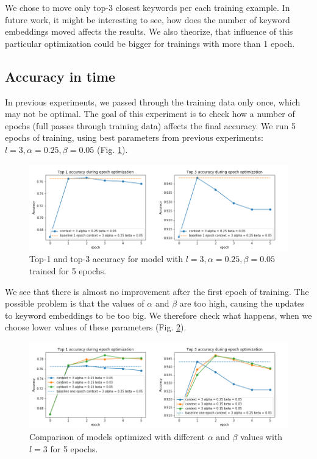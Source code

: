 \documentclass{llncs}
\begin{document}
We chose to move only top-3 closest keywords per each training example. In future work, it might be interesting to see, how does the number of keyword embeddings moved affects the results. We also theorize, that influence of this particular optimization could be bigger for trainings with more than 1 epoch.

\subsection{Accuracy in time}
In previous experiments, we passed through the training data only once, which may not be optimal.
The goal of this experiment is to check how a number of epochs (full passes through training data) affects the final accuracy.
We run 5 epochs of training, using best parameters from previous experiments: \(l=3, \alpha=0.25, \beta=0.05\) (Fig. \ref{fig:exp4_1_epochs_fixed}).

\begin{figure}[H]
    \centering
    \caption{Top-1 and top-3 accuracy for model with \(l=3, \alpha=0.25, \beta=0.05\) trained for 5 epochs.}
    \label{fig:exp4_1_epochs_fixed}
    \includegraphics[scale=0.6]{res/exp4_epoch_top_acc.png}
\end{figure}

We see that there is almost no improvement after the first epoch of training.
The possible problem is that the values of \(\alpha\) and \(\beta\) are too high, causing the updates to keyword embeddings to be too big.
We therefore check what happens, when we choose lower values of these parameters (Fig. \ref{fig:exp4_2_epochs_comparison}).

\begin{figure}[H]
    \centering
    \caption{Comparison of models optimized with different \(\alpha\) and \(\beta\) values with \(l=3\) for 5 epochs.}
    \label{fig:exp4_2_epochs_comparison}
    \includegraphics[scale=0.6]{res/exp4_epoch_multiconfiguration_top_acc.png}
\end{figure}
\end{document}
